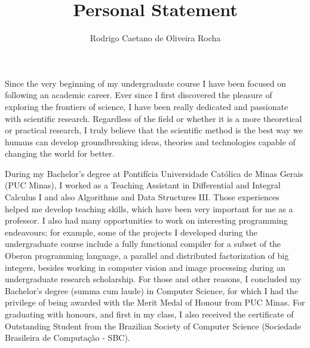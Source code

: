 \documentclass{article}
\title{Personal Statement}
\author{Rodrigo Caetano de Oliveira Rocha}
\date{}
\begin{document}
\maketitle

Since the very beginning of my undergraduate course I have been focused on
following an academic career.  Ever since I first discovered the pleasure of
exploring the frontiers of science, I have been really dedicated and passionate
with scientific research.  Regardless of the field or whether it is a more
theoretical or practical research, I truly believe that the scientific method
is the best way we humans can develop groundbreaking ideas, theories and
technologies capable of changing the world for better.

During my Bachelor's degree at Pontif\'{i}cia Universidade Cat\'{o}lica de
Minas Gerais (PUC Minas), I worked as a Teaching Assistant in Differential and
Integral Calculus I and also Algorithms and Data Structures III. Those
experiences helped me develop teaching skills, which have been very important
for me as a professor. I also had many opportunities to work on interesting
programming endeavours; for example, some of the projects I developed during
the undergraduate course include a fully functional compiler for a subset of
the Oberon programming language, a parallel and distributed factorization of
big integers, besides working in computer vision and image processing during an
undergraduate research scholarship. For those and other reasons, I concluded my
Bachelor's degree (summa cum laude) in Computer Science, for which I had the
privilege of being awarded with the Merit Medal of Honour from PUC Minas.  For
graduating with honours, and first in my class, I also received the certificate
of Outstanding Student from the Brazilian Society of Computer Science
(Sociedade Brasileira de Computa\c{c}\~{a}o - SBC).
\end{document}
